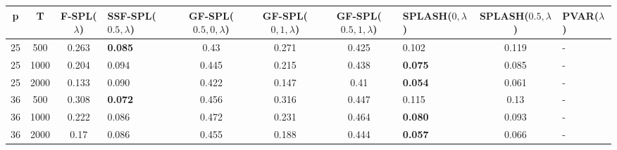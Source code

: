 \begin{tabular}{ccclccclcl}
\hline
  p  &  T   &  F-SPL($\lambda$)  & SSF-SPL($0.5, \lambda$)   &  GF-SPL($0.5, 0, \lambda$)  &  GF-SPL($0, 1, \lambda$)  &  GF-SPL($0.5, 1, \lambda$)  & SPLASH($0, \lambda$)   &  SPLASH($0.5, \lambda$)  & PVAR($\lambda$)   \\
\hline
 25  & 500  &       0.263        & \textbf{0.085}            &            0.43             &           0.271           &            0.425            & 0.102                  &          0.119           & -                 \\
 25  & 1000 &       0.204        & 0.094                     &            0.445            &           0.215           &            0.438            & \textbf{0.075}         &          0.085           & -                 \\
 25  & 2000 &       0.133        & 0.090                     &            0.422            &           0.147           &            0.41             & \textbf{0.054}         &          0.061           & -                 \\
 36  & 500  &       0.308        & \textbf{0.072}            &            0.456            &           0.316           &            0.447            & 0.115                  &           0.13           & -                 \\
 36  & 1000 &       0.222        & 0.086                     &            0.472            &           0.231           &            0.464            & \textbf{0.080}         &          0.093           & -                 \\
 36  & 2000 &        0.17        & 0.086                     &            0.455            &           0.188           &            0.444            & \textbf{0.057}         &          0.066           & -                 \\
\hline
\end{tabular}